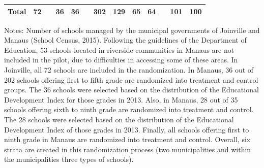 \documentclass[
	article,			%
	12pt,				%
	oneside,			%
	a4paper,			%
	]{article}
\begin{document}
\begin{landscape}
\begin{table}[htbp]
\begin{threeparttable}
\begin{tabular}{lcccccccccccc}
   \rowcolor{Gray}  Total &         72 &            &         36 &         36 &            &        302 &        129 &         65 &         64 &            &        101 &        100 \\
\hline
\end{tabular}  
 \label{tab:sample}
        \begin{tablenotes}
              \fontsize{9}{9}\selectfont 
              \item Notes: Number of schools managed by the municipal governments of Joinville and Manaus (School Census, 2015). Following the guidelines of the Department of Education, 53 schools located in riverside communities in Manaus are not included in the pilot, due to difficulties in accessing some of these areas. In Joinville, all 72 schools are included in the randomization. In Manaus, 36 out of 202 schools offering first to fifth grade are randomized into treatment and control groups. The 36 schools were selected based on the distribution of the Educational Development Index for those grades in 2013. Also, in Manaus, 28 out of 35 schools offering sixth to ninth grade are randomized into treatment and control. The 28 schools were selected based on the distribution of the Educational Development Index of those grades in 2013. Finally, all schools offering first to ninth grade in Manaus are randomized into treatment and control. Overall, six strata are created in this randomization process (two municipalities and within the municipalities three types of schools). 
    \end{tablenotes}

\end{threeparttable}
\end{table}
\end{landscape}
\end{document}

